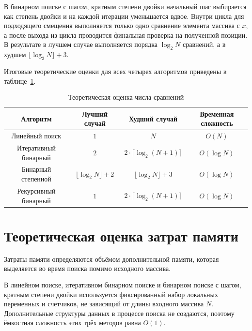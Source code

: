 В бинарном поиске с шагом, кратным степени двойки начальный шаг 
выбирается как степень двойки и на каждой итерации уменьшается вдвое.  
Внутри цикла для подходящего смещения выполняется только одно 
сравнение элемента массива с $x$, а после выхода из цикла 
проводится финальная проверка на полученной позиции. В результате 
в лучшем случае выполняется порядка $\log_2 N$ сравнений, 
а в худшем $\lfloor \log_2 N \rfloor + 3$.

Итоговые теоретические оценки для всех четырех алгоритмов 
приведены в таблице~\ref{tab:theoretical_est}.

\begin{table}[h!]
    \centering
    \begin{threeparttable}
        \caption{Теоретическая оценка числа сравнений}
        \label{tab:theoretical_est}
        \begin{tabular}{|c|c|c|c|}
            \hline
            Алгоритм & Лучший случай & Худший случай & Временная сложность \\
            \hline
            Линейный поиск & $1$ & $N$ & $O(N)$ \\
            \hline
            Итеративный бинарный & $2$ & $2 \cdot \lceil \log_2(N + 1) \rceil$ & $O(\log N)$ \\
            \hline
            Бинарный степенной & $\lfloor \log_2 N \rfloor + 2$ & $\lfloor \log_2 N \rfloor + 3$ & $O(\log N)$ \\
            \hline
            Рекурсивный бинарный & $1$ & $2 \cdot \lceil \log_2(N + 1) \rceil$ & $O(\log N)$ \\
            \hline
        \end{tabular}
    \end{threeparttable}
\end{table}

\section{Теоретическая оценка затрат памяти}

Затраты памяти определяются объёмом дополнительной 
памяти, которая выделяется во время поиска помимо исходного массива.

В линейном поиске, итеративном бинарном поиске и бинарном 
поиске с шагом, кратным степени двойки используется фиксированный 
набор локальных переменных и счетчиков, не зависящий от длины 
входного массива $N$. Дополнительные структуры данных в процессе 
поиска не создаются, поэтому ёмкостная слoжность этих 
трёх методов равна $O(1)$.

